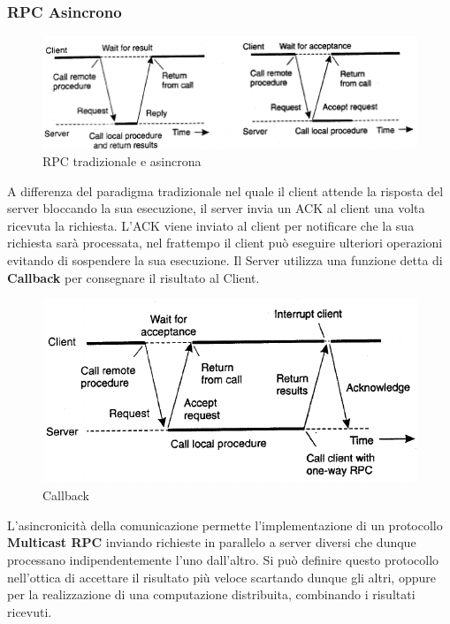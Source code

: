 \documentclass[12pt]{article}
\begin{document}
		\subsubsection{RPC Asincrono}
			\begin{figure}[h!]
				\centering
				\includegraphics[scale=0.45]{img/async.png}
				\caption{RPC tradizionale e asincrona }
			\end{figure}
			A differenza del paradigma tradizionale nel quale il client attende la risposta del server bloccando la sua esecuzione, il server invia un ACK al client una volta ricevuta la richiesta. L'ACK viene inviato al client per notificare che la sua richiesta sarà processata, nel frattempo il client può eseguire ulteriori operazioni evitando di sospendere la sua esecuzione. Il Server utilizza una funzione detta di \textbf{Callback} per consegnare il risultato al Client.
			\begin{figure}[h!]
				\centering
				\includegraphics[scale=0.40]{img/callback.png}
				\caption{Callback }
			\end{figure}
			L'asincronicità della comunicazione permette l'implementazione di un protocollo \textbf{Multicast RPC} inviando richieste in parallelo a server diversi che dunque processano indipendentemente l'uno dall'altro. Si può definire questo protocollo nell'ottica di accettare il risultato più veloce scartando dunque gli altri, oppure per la realizzazione di una computazione distribuita, combinando i risultati ricevuti.
			
\end{document}
